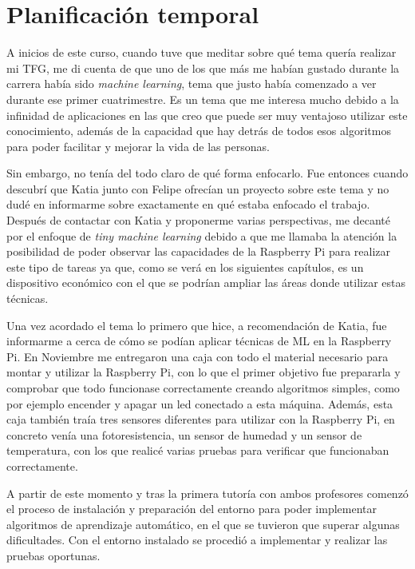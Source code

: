 \documentclass[a4paper, 12pt]{book}
\begin{document}
\section{Planificación temporal}
\label{sec:planificacion-temporal}

A inicios de este curso, cuando tuve que meditar sobre qué tema quería realizar mi TFG, me di cuenta de que uno de los que más me habían gustado durante la carrera había sido \textit{machine learning}, tema que justo había comenzado a ver durante ese primer cuatrimestre. Es un tema que me interesa mucho debido a la infinidad de aplicaciones en las que creo que puede ser muy ventajoso utilizar este conocimiento, además de la capacidad que hay detrás de todos esos algoritmos para poder facilitar y mejorar la vida de las personas.

Sin embargo, no tenía del todo claro de qué forma enfocarlo. Fue entonces cuando descubrí que Katia junto con Felipe ofrecían un proyecto sobre este tema y no dudé en informarme sobre exactamente en qué estaba enfocado el trabajo. Después de contactar con Katia y proponerme varias perspectivas, me decanté por el enfoque de \textit{tiny machine learning} debido a que me llamaba la atención la posibilidad de poder observar las capacidades de la Raspberry Pi para realizar este tipo de tareas ya que, como se verá en los siguientes capítulos, es un dispositivo económico con el que se podrían ampliar las áreas donde utilizar estas técnicas.

Una vez acordado el tema lo primero que hice, a recomendación de Katia, fue informarme a cerca de cómo se podían aplicar técnicas de ML en la Raspberry Pi. En Noviembre me entregaron una caja con todo el material necesario para montar y utilizar la Raspberry Pi, con lo que el primer objetivo fue prepararla y comprobar que todo funcionase correctamente creando algoritmos simples, como por ejemplo encender y apagar un led conectado a esta máquina. Además, esta caja también traía tres sensores diferentes para utilizar con la Raspberry Pi, en concreto venía una fotoresistencia, un sensor de humedad y un sensor de temperatura, con los que realicé varias pruebas para verificar que funcionaban correctamente.

A partir de este momento y tras la primera tutoría con ambos profesores comenzó el proceso de instalación y preparación del entorno para poder implementar algoritmos de aprendizaje automático, en el que se tuvieron que superar algunas dificultades. Con el entorno instalado se procedió a implementar y realizar las pruebas oportunas.
\end{document}

